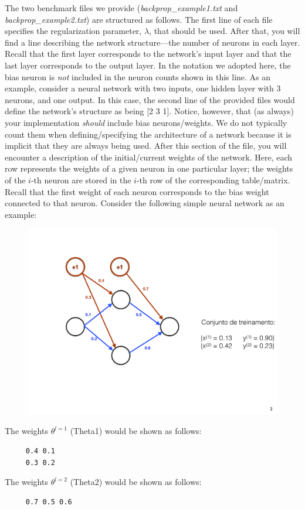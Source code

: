 \documentclass[letterpaper]{article}
\begin{document}
The two benchmark files we provide (\emph{backprop\_example1.txt} and \emph{backprop\_example2.txt}) are structured as follows. The first line of each file specifies the regularization parameter, $\lambda$, that should be used. After that, you will find a line describing the network structure---the number of neurons in each layer. Recall that the first layer corresponds to the network's input layer and that the last layer corresponds to the output layer. In the notation we adopted here, the bias neuron is \textit{not} included in the neuron counts shown in this line. As an example, consider a neural network with two inputs, one hidden layer with 3 neurons, and one output. In this case, the second line of the provided files would define the network's structure as being [2 3 1]. Notice, however, that (as always) your implementation \textit{should} include bias neurons/weights. We do not typically count them when defining/specifying the architecture of a network because it is implicit that they are always being used. After this section of the file, you will encounter a description of the initial/current weights of the network. Here, each row represents the weights of a given neuron in one particular layer; the weights of the $i$-th neuron are stored in the $i$-th row of the corresponding table/matrix. Recall that the first weight of each neuron corresponds to the bias weight connected to that neuron. Consider the following simple neural network as an example:

	\begin{figure}[!h]
		\centering
		\includegraphics[width=0.3\columnwidth]{figures/network_example.pdf}
	\end{figure}

	\noindent The weights $\theta^{l=1}$ (Theta1) would be shown as follows:
	\begin{verbatim}
     0.4 0.1
     0.3 0.2
	\end{verbatim}
	The weights $\theta^{l=2}$ (Theta2) would be shown as follows:	
	\begin{verbatim}
     0.7 0.5 0.6
	\end{verbatim}
\end{document}

